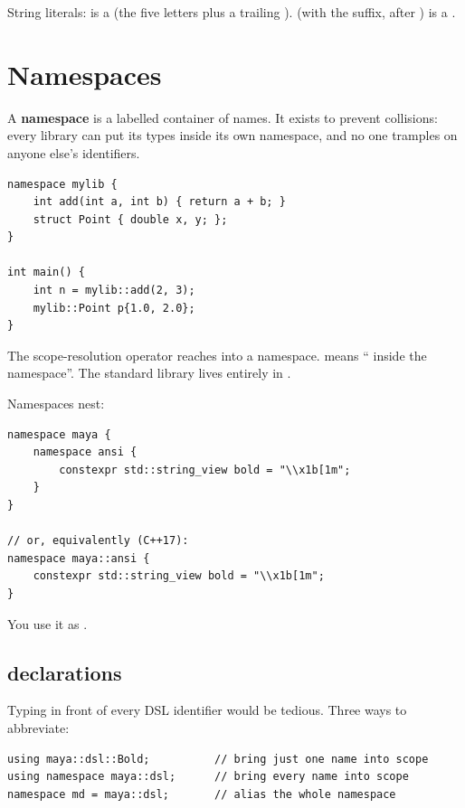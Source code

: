 String literals:  is a  (the five
letters plus a trailing ). 
(with the  suffix, after ) is a .

\section{Namespaces}
\label{sec:cpp:namespaces}

A \textbf{namespace} is a labelled container of names. It exists to
prevent collisions: every library can put its types inside its own
namespace, and no one tramples on anyone else's identifiers.

\begin{lstlisting}
namespace mylib {
    int add(int a, int b) { return a + b; }
    struct Point { double x, y; };
}

int main() {
    int n = mylib::add(2, 3);
    mylib::Point p{1.0, 2.0};
}
\end{lstlisting}

The scope-resolution operator \code{::} reaches into a namespace.
 means `` inside the 
namespace''. The standard library lives entirely in .

Namespaces nest:

\begin{lstlisting}
namespace maya {
    namespace ansi {
        constexpr std::string_view bold = "\\x1b[1m";
    }
}

// or, equivalently (C++17):
namespace maya::ansi {
    constexpr std::string_view bold = "\\x1b[1m";
}
\end{lstlisting}

You use it as .

\subsection{ declarations}

Typing  in front of every DSL identifier would be
tedious. Three ways to abbreviate:

\begin{lstlisting}
using maya::dsl::Bold;          // bring just one name into scope
using namespace maya::dsl;      // bring every name into scope
namespace md = maya::dsl;       // alias the whole namespace
\end{lstlisting}

